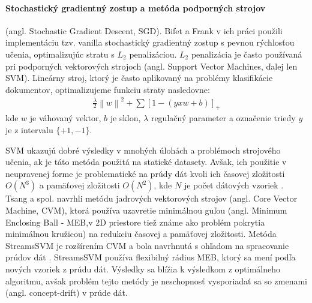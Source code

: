 \paragraph{Stochastický gradientný zostup a metóda podporných strojov} (angl. Stochastic Gradient Descent, SGD). Bifet a Frank v ich práci použili implementáciu tzv. vanilla stochastický gradientný zostup s pevnou rýchlosťou učenia, optimalizujúc stratu s $L_2$ penalizáciou. $L_2$ penalizácia je často používaná pri podporných vektorových strojoch (angl. Support Vector Machines, ďalej len SVM). Lineárny stroj, ktorý je často aplikovaný na problémy klasifikácie dokumentov, optimalizujeme funkciu straty nasledovne:
\begin{align*}
\frac{\lambda }{2}\left \| w \right \|^{2}+\sum [1-(yxw + b)]_{+}
\end{align*}
kde $w$ je váhovaný vektor, $b$ je sklon, $\lambda$ regulačný parameter a označenie triedy $y$ je z intervalu $\{+1, -1\}$.
\par
SVM ukazujú dobré výsledky v mnohých úlohách a problémoch strojového učenia, ak je táto metóda použitá na statické datasety. Avšak, ich použitie v neupravenej forme je problematické na prúdy dát kvoli ich časovej zložitosti $O(N^3)$ a pamäťovej zložitosti $O(N^2)$, kde $N$ je počet dátových vzoriek \citep{nguyen2015survey}. Tsang a spol. navrhli metódu jadrových vektorových strojov (angl. Core Vector Machine, CVM), ktorá používa uzavretie minimálnou guľou (angl. Minimum Enclosing Ball - MEB,v 2D priestore tiež známe ako problém pokrytia minimálnou kružicou) na redukciu časovej a pamäťovej zložitosti. Metóda StreamsSVM je rozšírením CVM a bola navrhnutá s ohľadom na spracovanie prúdov dát \citep{rai2009streamed}. StreamsSVM používa flexibilný rádius MEB, ktorý sa mení podľa nových vzoriek z prúdu dát. Výsledky sa blížia k výsledkom z optimálneho algoritmu, avšak problém tejto metódy je neschopnosť vysporiadať sa so zmenami (angl. concept-drift) v prúde dát.


